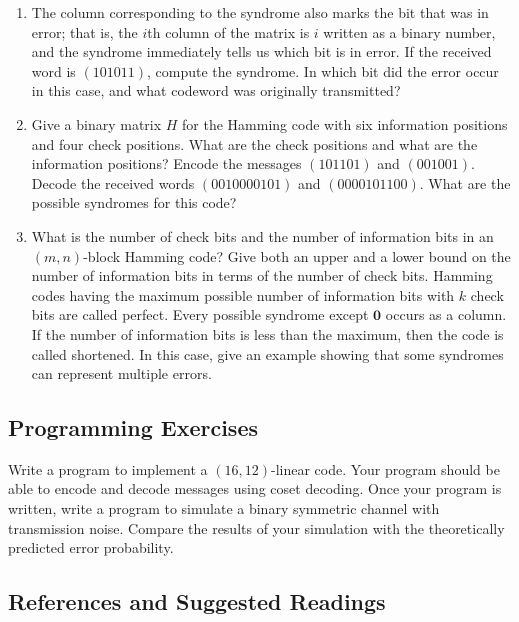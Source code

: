 {\begin{enumerate}
\begin{enumerate}
 \item
The column corresponding to the syndrome also marks the bit that was
in error; that is, the $i$th column of the matrix is $i$ written as a
binary number, and the syndrome 
immediately tells us which bit is in error. If the received word is 
$(101011)$, compute the syndrome.  In
which bit did the error occur in this case, and what codeword was
originally transmitted?
 
 \item
Give a binary matrix $H$ for the Hamming code with six information
positions and four check positions. What are the check positions and
what are the information positions? Encode the messages $(101101)$ and
$(001001)$. Decode the received words $(0010000101)$ and
$(0000101100)$.  What are the possible syndromes for this code?
 
 \item
What is the number of check bits and the number of information bits in an
$(m,n)$-block Hamming code? Give both an upper and a lower bound on the
number of information bits in terms of the number of check bits.
Hamming codes having the maximum possible number of information bits
with $k$ check bits are called {\bfi
perfect}. Every possible syndrome except
${\mathbf 0}$ occurs as a column. If the number of information bits is
less than the maximum, then the code is called {\bfi
shortened}. In this case, give an example
showing that some syndromes can represent multiple errors.  
 
\end{enumerate}
 
 
\end{enumerate}
}
 
 
\subsection*{Programming Exercises}
 
 
{\small
Write a program to implement a $(16, 12)$-linear code.  Your program
should be able to encode and decode messages using coset decoding.
Once your program is written, write a program to simulate a binary
symmetric channel with transmission noise.  Compare the results of
your simulation with the theoretically predicted error probability. 
}
 
 
\subsection*{References and Suggested Readings}
 
